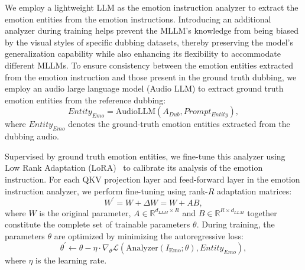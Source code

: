 We employ a lightweight LLM as the emotion instruction analyzer to extract the emotion entities from the emotion instructions.
Introducing an additional analyzer during training helps prevent the MLLM's knowledge from being biased by the visual styles of specific dubbing datasets, thereby preserving the model's generalization capability while also enhancing its flexibility to accommodate different MLLMs.
To ensure consistency between the emotion entities extracted from the emotion instruction and those present in the ground truth dubbing, we employ an audio large language model (Audio LLM) to extract ground truth emotion entities from the reference dubbing:
\begin{equation}
     Entity_{Emo} = \mathrm{AudioLLM}(A_{Dub},Prompt_{Entity}),
\end{equation}
where $Entity_{Emo}$ denotes the ground-truth emotion entities extracted from the dubbing audio.



Supervised by ground truth emotion entities, we fine-tune this analyzer using Low Rank Adaptation (LoRA)~\cite{lora} to calibrate its analysis of the emotion instruction.
For each QKV projection layer and feed-forward layer in the emotion instruction analyzer, we perform fine-tuning using rank-$R$ adaptation matrices:
\begin{equation}
    W^{\prime}=W+\Delta W=W+AB,
\end{equation}
where $W$ is the original parameter, $A\in\mathbb{R}^{d_{LLM}\times R}$ and $B\in\mathbb{R}^{R\times d_{LLM}}$ together constitute the complete set of trainable parameters $\theta$. 
During training, the parameters $\theta$ are optimized by minimizing the autoregressive loss:
\begin{equation}
    \theta^{\prime}\leftarrow\theta-\eta\cdot\nabla_\theta\mathcal{L}(\mathrm{Analyzer}(I_\mathrm{Emo};\theta),Entity_{Emo}),
\end{equation}
where $\eta$ is the learning rate.

